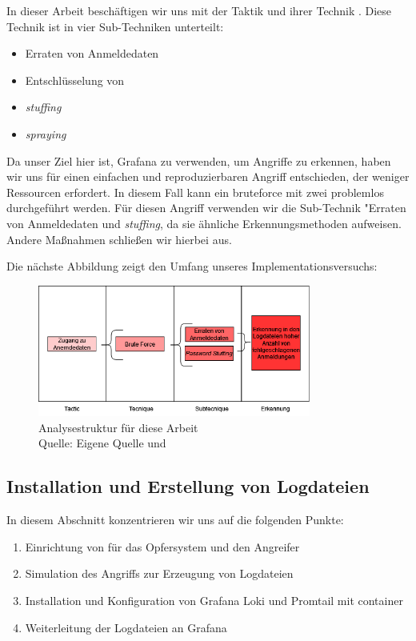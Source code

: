 In dieser Arbeit beschäftigen wir uns mit der Taktik  und ihrer Technik . Diese Technik ist in vier Sub-Techniken unterteilt:

{
\begin{itemize}[noitemsep]
   \item Erraten von Anmeldedaten 
   \item	Entschlüsselung von 
   \item \textit{\gls{stuffing}}
   \item \textit{\gls{spraying}}
\end{itemize}
}

Da unser Ziel hier ist, Grafana zu verwenden, um Angriffe zu erkennen, haben wir uns für einen einfachen und reproduzierbaren Angriff entschieden, der weniger Ressourcen erfordert. In diesem Fall kann ein \gls{bruteforce} mit zwei  problemlos durchgeführt werden. Für diesen Angriff verwenden wir die Sub-Technik "Erraten von Anmeldedaten und \textit{\gls{stuffing}}, da sie ähnliche Erkennungsmethoden aufweisen. Andere Maßnahmen schließen wir hierbei aus.


Die nächste Abbildung zeigt den Umfang unseres Implementationsversuchs:
\begin{figure}[H]
   \centering
   \includegraphics[width=0.8\textwidth]{assets/T1110.drawio.png}
   \caption{Analysestruktur für diese Arbeit  \\Quelle: Eigene Quelle und \citep{Mitre_t1110}}
   \centering
\end{figure}

\newpage
\subsection{Installation und Erstellung von Logdateien}
In diesem Abschnitt konzentrieren wir uns auf die folgenden Punkte:

\begin{enumerate}[noitemsep]
   \item Einrichtung von  für das Opfersystem und den Angreifer
   \item Simulation des Angriffs zur Erzeugung von Logdateien
   \item Installation und Konfiguration von Grafana Loki und Promtail mit \gls{container}
   \item Weiterleitung der Logdateien an Grafana
   \end{enumerate}

